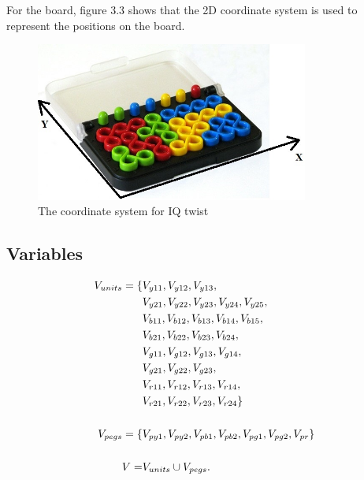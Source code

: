 For the board, figure 3.3 shows that the 2D coordinate system is used to represent the positions on the board. 
\begin{figure}[htbp]
\centering
\includegraphics[width=0.8\textwidth]{figs/IQtwistboard.jpg}
\caption{The coordinate system for IQ twist}
    \label{fig:coordinate}
\end{figure}
\subsection{Variables}
\begin{align*}
V_{units}=\{&V_{y11},V_{y12},V_{y13},\\&V_{y21},V_{y22},V_{y23},V_{y24},V_{y25},\\&V_{b11},V_{b12},V_{b13},V_{b14},
V_{b15},\\&V_{b21},V_{b22},V_{b23},V_{b24},\\&V_{g11},V_{g12},V_{g13},V_{g14},\\&V_{g21},V_{g22},V_{g23},\\&V_{r11},
V_{r12},V_{r13},V_{r14},\\&V_{r21},V_{r22},V_{r23},V_{r24}\}\\
\\V_{pegs} = \{&V_{py1}, V_{py2}, V_{pb1}, V_{pb2}, V_{pg1}, V_{pg2}, V_{pr}\}\\
\\V = &V_{units} \cup V_{pegs}.
\end{align*}
